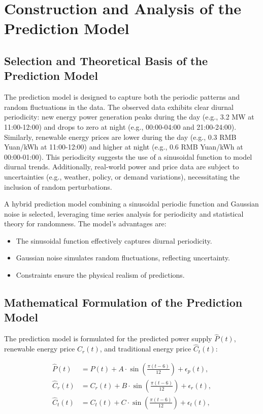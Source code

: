\documentclass[a4paper,12pt]{article}
\begin{document}
\section{Construction and Analysis of the Prediction Model}

\subsection{Selection and Theoretical Basis of the Prediction Model}

The prediction model is designed to capture both the periodic patterns and random fluctuations in the data. The observed data exhibits clear diurnal periodicity: new energy power generation peaks during the day (e.g., 3.2 MW at 11:00-12:00) and drops to zero at night (e.g., 00:00-04:00 and 21:00-24:00). Similarly, renewable energy prices are lower during the day (e.g., 0.3 RMB Yuan/kWh at 11:00-12:00) and higher at night (e.g., 0.6 RMB Yuan/kWh at 00:00-01:00). This periodicity suggests the use of a sinusoidal function to model diurnal trends. Additionally, real-world power and price data are subject to uncertainties (e.g., weather, policy, or demand variations), necessitating the inclusion of random perturbations.

A hybrid prediction model combining a sinusoidal periodic function and Gaussian noise is selected, leveraging time series analysis for periodicity and statistical theory for randomness. The model's advantages are:

\begin{itemize}
    \item The sinusoidal function effectively captures diurnal periodicity.
    \item Gaussian noise simulates random fluctuations, reflecting uncertainty.
    \item Constraints ensure the physical realism of predictions.
\end{itemize}

\subsection{Mathematical Formulation of the Prediction Model}

The prediction model is formulated for the predicted power supply \( \hat{P}(t) \), renewable energy price \( \hat{C}_r(t) \), and traditional energy price \( \hat{C}_t(t) \):

\begin{align}
\hat{P}(t) &= P(t) + A \cdot \sin\left(\frac{\pi (t - 6)}{12}\right) + \epsilon_p(t), \label{eq:power_pred} \\
\hat{C}_r(t) &= C_r(t) + B \cdot \sin\left(\frac{\pi (t - 6)}{12}\right) + \epsilon_r(t), \label{eq:renew_price_pred} \\
\hat{C}_t(t) &= C_t(t) + C \cdot \sin\left(\frac{\pi (t - 6)}{12}\right) + \epsilon_t(t), \label{eq:trad_price_pred}
\end{align}
\end{document}
